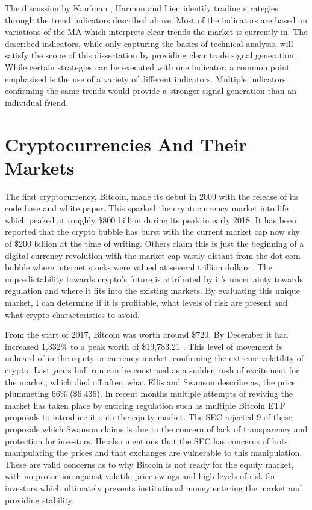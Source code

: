 The discussion by Kaufman \cite{BOOK:Kaufman:2013}, Harmon \cite{BOOK:Harmon:2014} and Lien \cite{BOOK:Lien:2016} identify trading strategies through the trend indicators described above. Most of the indicators are based on variations of the MA which interprets clear trends the market is currently in. The described indicators, while only capturing the basics of technical analysis, will satisfy the scope of this dissertation by providing clear trade signal generation. While certain strategies can be executed with one indicator, a common point emphasised is the use of a variety of different indicators. Multiple indicators confirming the same trends would provide a stronger signal generation than an individual friend. 

\section{Cryptocurrencies And Their Markets}
\label{sec:related:cryptoAndTheirMarkets}

The first cryptocurrency, Bitcoin, made its debut in 2009 with the release of its code base and white paper. This sparked the cryptocurrency market into life which peaked at roughly \$800 billion during its peak in early 2018. It has been reported that the crypto bubble has burst with the current market cap now shy of \$200 billion at the time of writing. Others claim this is just the beginning of a digital currency revolution with the market cap vastly distant from the dot-com bubble where internet stocks were valued at several trillion dollars \cite{ART:Kharpal:2018}. The unpredictability towards crypto's future is attributed by it's uncertainty towards regulation and where it fits into the existing markets. By evaluating this unique market, I can determine if it is profitable, what levels of risk are present and what crypto characteristics to avoid.

From the start of 2017, Bitcoin was worth around \$720. By December it had increased 1,332\% to a peak worth of \$19,783.21 \cite{ART:ELLIS:2018}. This level of movement is unheard of in the equity or currency market, confirming the extreme volatility of crypto. Last years bull run can be construed as a sudden rush of excitement for the market, which died off after, what Ellis and Swanson \cite{ART:ELLIS:2018} describe as, the price plummeting 66\% (\$6,436). In recent months multiple attempts of reviving the market has taken place by enticing regulation such as multiple Bitcoin ETF proposals to introduce it onto the equity market. The SEC rejected 9 of these proposals which Swanson \cite{ART:ELLIS:2018} claims is due to the concern of lack of transparency and protection for investors. He also mentions that the SEC has concerns of bots manipulating the prices and that exchanges are vulnerable to this manipulation. These are valid concerns as to why Bitcoin is not ready for the equity market, with no protection against volatile price swings and high levels of risk for investors which ultimately prevents institutional money entering the market and providing stability. 

